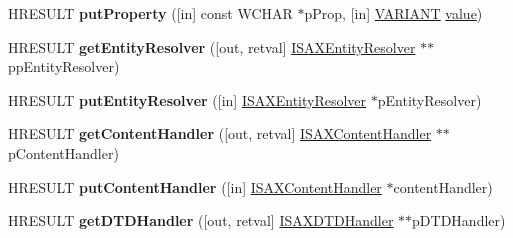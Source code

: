 \begin{DoxyCompactItemize}
H\+R\+E\+S\+U\+LT {\bfseries put\+Property} (\mbox{[}in\mbox{]} const W\+C\+H\+AR $\ast$p\+Prop, \mbox{[}in\mbox{]} \hyperlink{structtag_v_a_r_i_a_n_t}{V\+A\+R\+I\+A\+NT} \hyperlink{unionvalue}{value})
\item 
\mbox{\label{interface_m_s_x_m_l2_1_1_i_s_a_x_x_m_l_reader_a32edf4b3dccbef367949bd5b593c30e6}} 
H\+R\+E\+S\+U\+LT {\bfseries get\+Entity\+Resolver} (\mbox{[}out, retval\mbox{]} \hyperlink{interface_m_s_x_m_l2_1_1_i_s_a_x_entity_resolver}{I\+S\+A\+X\+Entity\+Resolver} $\ast$$\ast$pp\+Entity\+Resolver)
\item 
\mbox{\label{interface_m_s_x_m_l2_1_1_i_s_a_x_x_m_l_reader_acb43fff6e9ce8e001c6fa7af71a2b5f8}} 
H\+R\+E\+S\+U\+LT {\bfseries put\+Entity\+Resolver} (\mbox{[}in\mbox{]} \hyperlink{interface_m_s_x_m_l2_1_1_i_s_a_x_entity_resolver}{I\+S\+A\+X\+Entity\+Resolver} $\ast$p\+Entity\+Resolver)
\item 
\mbox{\label{interface_m_s_x_m_l2_1_1_i_s_a_x_x_m_l_reader_afdc4280795d73bec86c6196c9855006b}} 
H\+R\+E\+S\+U\+LT {\bfseries get\+Content\+Handler} (\mbox{[}out, retval\mbox{]} \hyperlink{interface_m_s_x_m_l2_1_1_i_s_a_x_content_handler}{I\+S\+A\+X\+Content\+Handler} $\ast$$\ast$p\+Content\+Handler)
\item 
\mbox{\label{interface_m_s_x_m_l2_1_1_i_s_a_x_x_m_l_reader_a5b8dfa33b33dec8b893c3068922632dc}} 
H\+R\+E\+S\+U\+LT {\bfseries put\+Content\+Handler} (\mbox{[}in\mbox{]} \hyperlink{interface_m_s_x_m_l2_1_1_i_s_a_x_content_handler}{I\+S\+A\+X\+Content\+Handler} $\ast$content\+Handler)
\item 
\mbox{\label{interface_m_s_x_m_l2_1_1_i_s_a_x_x_m_l_reader_a956a9e33dde61073527429f1235973d3}} 
H\+R\+E\+S\+U\+LT {\bfseries get\+D\+T\+D\+Handler} (\mbox{[}out, retval\mbox{]} \hyperlink{interface_m_s_x_m_l2_1_1_i_s_a_x_d_t_d_handler}{I\+S\+A\+X\+D\+T\+D\+Handler} $\ast$$\ast$p\+D\+T\+D\+Handler)
\item 
\mbox{\label{interface_m_s_x_m_l2_1_1_i_s_a_x_x_m_l_reader_acd77199c05b3b894ba1d95140c966481}} 
$$
\end{DoxyCompactItemize}
